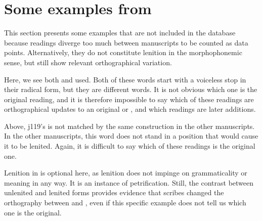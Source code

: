 \section{Some examples from }
\label{sec:some-examples-from}
This section presents some examples that are not included in the database because readings diverge too much between manuscripts to be counted as data points. Alternatively, they do not constitute lenition in the morphophonemic sense, but still show relevant orthographical variation. 
\begin{mwl}
\end{mwl}
Here, we see both  and  used. Both of these words start with a voiceless stop in their radical form, but they are different words. It is not obvious which one is the original reading, and it is therefore impossible to say which of these readings are orthographical updates to an original  or , and which readings are later additions.

\begin{mwl}
\end{mwl}
Above, \gls{j119}'s  is not matched by the same construction in the other manuscripts. In the other manuscripts, this word does not stand in a position that would cause it to be lenited. Again, it is difficult to say which of these readings is the original one.

\begin{mwl}
\end{mwl}
Lenition in  is optional here, as lenition does not impinge on grammaticality or meaning in any way. It is an instance of petrification. Still, the contrast between unlenited and lenited forms provides evidence that scribes changed the orthography between  and , even if this specific example does not tell us which one is the original.

